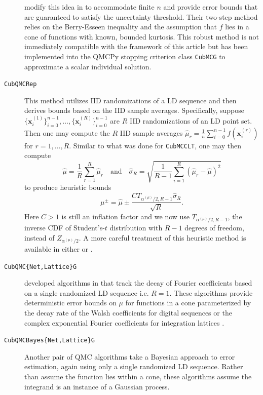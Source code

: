 \documentclass[graybox]{svmult}
\begin{document}
\begin{description}
    \citeauthor{cubmcg} modify this idea in \cite{cubmcg} to accommodate  finite $n$ and provide error bounds that are guaranteed to satisfy the uncertainty threshold. Their two-step method relies on the Berry-Esseen inequality and the assumption that $f$ lies in a cone of functions with known, bounded kurtosis. This robust method is not immediately compatible with the framework of this article but has been implemented into the QMCPy stopping criterion class \texttt{CubMCG} to approximate a scalar individual solution.
    \item[\texttt{CubQMCRep}] This method utilizes IID randomizations of a LD sequence and then derives bounds based on the IID sample averages. Specifically, suppose $\{\boldsymbol{x}_i^{(1)}\}_{i=0}^{n-1},\dots,\{\boldsymbol{x}_i^{(R)}\}_{i=0}^{n-1}$ are $R$ IID randomizations of an LD point set. Then one may compute the $R$ IID sample averages $\hat{\mu}_r = \frac{1}{n} \sum_{i=0}^{n-1} f(\boldsymbol{x}_i^{(r)})$ for $r = 1,\dots,R$. Similar to what was done for \texttt{CubMCCLT}, one may then compute 
    $$\hat{\mu} = \frac{1}{R} \sum_{r=1}^R \hat{\mu}_r \quad\text{and}\quad \hat{\sigma}_R = \sqrt{\frac{1}{R-1}\sum_{i=1}^R(\hat{\mu}_r - \hat{\mu})^2}$$
    to produce heuristic bounds  
    $$\mu^\pm = \hat{\mu} \pm \frac{C T_{\alpha^{(\mu)}/2,R-1} \hat{\sigma}_R}{\sqrt{R}}.$$
    Here $C>1$ is still an inflation factor and we now use $T_{\alpha^{(\mu)}/2,R-1}$, the inverse CDF of Student's-$t$ distribution with $R-1$ degrees of freedom, instead of $Z_{\alpha^{(\mu)}/2}$.
    A more careful treatment of this heuristic method is available in either \cite[Chapter 17]{mcbook} or \cite{qmc4pde_preprint}. 
    \item[\texttt{CubQMC\{Net,Lattice\}G}] \citeauthor{cubqmclattice} developed algorithms in \cite{adaptive_qmc} that track the decay of Fourier coefficients based on a single randomized LD sequence i.e. $R=1$. These algorithms provide deterministic error bounds on $\mu$ for functions in a cone parameterized by the decay rate of the Walsh coefficients for digital sequences \cite{cubqmcsobol} or the complex exponential Fourier coefficients for integration lattices \cite{cubqmclattice}. %
    \item[\texttt{CubQMCBayes\{Net,Lattice\}G}] Another pair of QMC algorithms take a Bayesian approach to error estimation, again using only a single randomized LD sequence. Rather than assume the function lies within a cone, these algorithms assume the integrand is an instance of a Gaussian process. 

\end{description}
\end{document}
